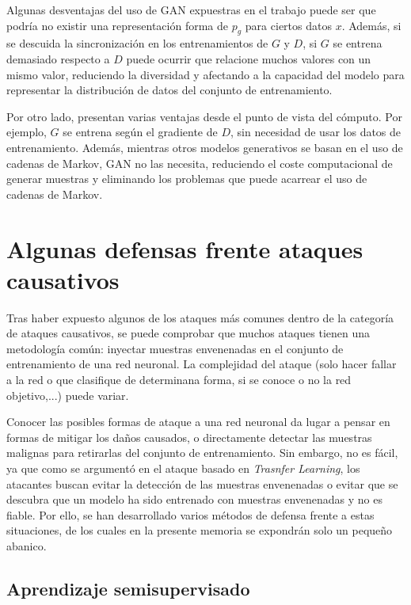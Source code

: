 Algunas desventajas del uso de GAN expuestras en el trabajo puede ser que podría no existir una representación forma de $p_g$ para ciertos datos $x$. Además, si se descuida la sincronización en los entrenamientos de $G$ y $D$, si $G$ se entrena demasiado respecto a $D$ puede ocurrir que relacione muchos valores con un mismo valor, reduciendo la diversidad y afectando a la capacidad del modelo para representar la distribución de datos del conjunto de entrenamiento.

Por otro lado, presentan varias ventajas desde el punto de vista del cómputo. Por ejemplo, $G$ se entrena según el gradiente de $D$, sin necesidad de usar los datos de entrenamiento. Además, mientras otros modelos generativos se basan en el uso de cadenas de Markov, GAN no las necesita, reduciendo el coste computacional de generar muestras y eliminando los problemas que puede acarrear el uso de cadenas de Markov.


\section{Algunas defensas frente ataques causativos}

Tras haber expuesto algunos de los ataques más comunes dentro de la categoría de ataques causativos, se puede comprobar que muchos ataques tienen una metodología común: inyectar muestras envenenadas en el conjunto de entrenamiento de una red neuronal. La complejidad del ataque (solo hacer fallar a la red o que clasifique de determinana forma, si se conoce o no la red objetivo,...) puede variar.

Conocer las posibles formas de ataque a una red neuronal da lugar a pensar en formas de mitigar los daños causados, o directamente detectar las muestras malignas para retirarlas del conjunto de entrenamiento. Sin embargo, no es fácil, ya que como se argumentó en el ataque basado en \textit{Trasnfer Learning}, los atacantes buscan evitar la detección de las muestras envenenadas o evitar que se descubra que un modelo ha sido entrenado con muestras envenenadas y no es fiable. Por ello, se han desarrollado varios métodos de defensa frente a estas situaciones, de los cuales en la presente memoria se expondrán solo un pequeño abanico.

\subsection*{Aprendizaje semisupervisado}

